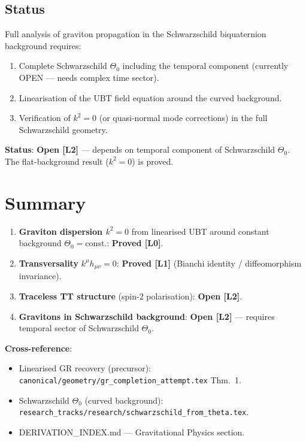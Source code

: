 \documentclass[11pt,a4paper]{article}
\theoremstyle{definition}
\theoremstyle{remark}
\begin{document}
\subsection{Status}

\begin{tcolorbox}[colback=yellow!10!white,colframe=orange!75!black,
                  title={Curved-Background Gravitons: Open}]
Full analysis of graviton propagation in the Schwarzschild biquaternion
background requires:
\begin{enumerate}
  \item Complete Schwarzschild $\Theta_0$ including the temporal component
        (currently OPEN — needs complex time sector).
  \item Linearisation of the UBT field equation around the curved background.
  \item Verification of $k^2 = 0$ (or quasi-normal mode corrections)
        in the full Schwarzschild geometry.
\end{enumerate}
\textbf{Status}: \textbf{Open [L2]} — depends on temporal component of
Schwarzschild $\Theta_0$.  The flat-background result ($k^2 = 0$)
is proved.
\end{tcolorbox}

\section{Summary}
\label{sec:summary}

\begin{tcolorbox}[colback=green!5!white,colframe=green!75!black,
                  title={Summary}]
\begin{enumerate}
  \item \textbf{Graviton dispersion $k^2 = 0$} from linearised UBT around
        constant background $\Theta_0 = \mathrm{const.}$:
        \textbf{Proved [L0]}.

  \item \textbf{Transversality} $k^\mu h_{\mu\nu} = 0$:
        \textbf{Proved [L1]} (Bianchi identity / diffeomorphism invariance).

  \item \textbf{Traceless TT structure} (spin-2 polarisation):
        \textbf{Open [L2]}.

  \item \textbf{Gravitons in Schwarzschild background}:
        \textbf{Open [L2]} — requires temporal sector of Schwarzschild $\Theta_0$.
\end{enumerate}

\textbf{Cross-reference}:
\begin{itemize}
  \item Linearised GR recovery (precursor): \texttt{canonical/geometry/gr\_completion\_attempt.tex} Thm.~1.
  \item Schwarzschild $\Theta_0$ (curved background): \texttt{research\_tracks/research/schwarzschild\_from\_theta.tex}.
  \item DERIVATION\_INDEX.md --- Gravitational Physics section.
\end{itemize}
\end{tcolorbox}
\end{document}
